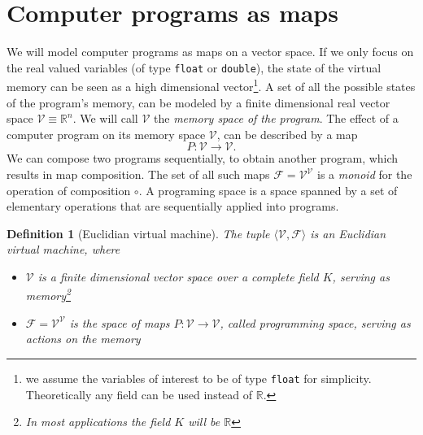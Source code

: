 \documentclass[preprint,12pt]{elsarticle}
\newcommand{\RR}{\mathbb{R}}
\newcommand{\VV}{\mathcal{V}}
\newcommand{\F}{\mathcal{F}}
\newtheorem{definicija}{Definition}[section]
\begin{document}
\section{Computer programs as maps}
We will model computer programs as maps on a vector space. If
we only focus on the real valued variables (of type \texttt{float} or
\texttt{double}),  the state of the virtual memory can be seen as a high
dimensional vector\footnote{we assume the variables of interest to be of type \texttt{float} for
  simplicity. Theoretically any field can be used instead of $\RR$.}. 
A set of all the possible states of the program's memory,
can be modeled by a finite dimensional real vector space $\VV\equiv \RR^n$. We
will call $\VV$ the \emph{memory space of the program}. The effect of a computer
program on its memory space $\VV$, can be described by a map
\begin{equation}
  \label{eq:map}
  P:\VV\to \VV.
\end{equation}
We can compose two programs sequentially, to obtain another program, which
results in map composition. The set of all such maps $\F=\VV^\VV$ is a
\emph{monoid} for the operation of composition $\circ$. A programing space is
a space spanned by a set of elementary operations that are sequentially applied into programs. 
\begin{definicija}[Euclidian virtual machine] The tuple $\langle \VV,\F\rangle$ is an Euclidian virtual machine, where
  \begin{itemize}
  \item
  $\VV$ is a finite dimensional vector space over a complete field $K$, serving as memory\footnote{In most applications the field $K$ will
    be $\RR$}
  \item
  $\F= \VV^\VV$ is the space of maps $P:\VV\to \VV$, called \emph{programming space}, serving as actions on the memory
  \end{itemize}  
\end{definicija}
\end{document}
